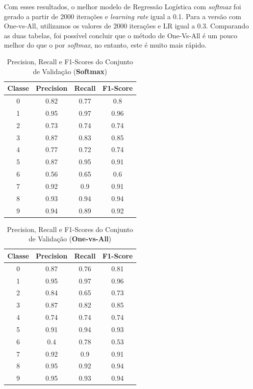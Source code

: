\documentclass[conference]{IEEEtran}
\begin{document}
	Com esses resultados, o melhor modelo de Regressão Logística com \textit{softmax} foi gerado a partir de 2000 iterações e \textit{learning rate} igual a 0.1. Para a versão com One-vs-All, utilizamos os valores de 2000 iterações e LR igual a 0.3. Comparando as duas tabelas, foi possível concluir que o método de One-Vs-All é um pouco melhor do que o por \textit{softmax}, no entanto, este é muito mais rápido.

\begin{table}[h!]
 \begin{center}
  \caption{Precision, Recall e F1-Scores do Conjunto de Validação (\textbf{Softmax})}
  \label{table:table3}
  \begin{tabular}{ |c|c|c|c| }
   \hline
   Classe & Precision & Recall & F1-Score\\
   \hline
   0 & 0.82 & 0.77 & 0.8 \\
   1 & 0.95 & 0.97 & 0.96 \\
   2 & 0.73 & 0.74 & 0.74 \\
   3 & 0.87 & 0.83 & 0.85 \\
   4 & 0.77 & 0.72 & 0.74 \\
   5 & 0.87 & 0.95 & 0.91 \\
   6 & 0.56 & 0.65 & 0.6 \\
   7 & 0.92 & 0.9 & 0.91 \\
   8 & 0.93 & 0.94 & 0.94 \\
   9 & 0.94 & 0.89 & 0.92 \\
   \hline
 \end{tabular}
 \end{center}
\end{table}

\begin{table}[h!]
 \begin{center}
  \caption{Precision, Recall e F1-Scores do Conjunto de Validação (\textbf{One-vs-All})}
  \label{table:table3}
  \begin{tabular}{ |c|c|c|c| }
   \hline
   Classe & Precision & Recall & F1-Score\\
   \hline
   0 & 0.87 & 0.76 & 0.81 \\
   1 & 0.95 & 0.97 & 0.96 \\
   2 & 0.84 & 0.65 & 0.73 \\
   3 & 0.87 & 0.82 & 0.85 \\
   4 & 0.74 & 0.74 & 0.74 \\
   5 & 0.91 & 0.94 & 0.93 \\
   6 & 0.4 & 0.78 & 0.53 \\
   7 & 0.92 & 0.9 & 0.91 \\
   8 & 0.95 & 0.92 & 0.94 \\
   9 & 0.95 & 0.93 & 0.94 \\
   \hline
 \end{tabular}
 \end{center}
\end{table}
\end{document}
